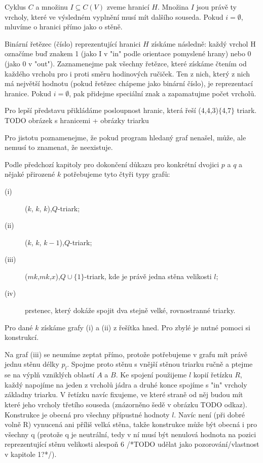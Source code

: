 \begin{definice}\label{def01:1}
Cyklus $C$ a množinu $I \subseteq C(V)$ zveme hranicí $H$. Množina $I$ jsou právě ty vrcholy, které ve výsledném vyplnění musí mít dalšího souseda. Pokud  $i = \emptyset$, mluvíme o hranici přímo jako o stěně.

Binární řetězec (číslo) reprezentující hranici $H$ získáme následně: každý vrchol H označíme buď znakem 1 (jako I v "in" podle orientace pomyslené hrany) nebo 0 (jako 0 v "out"). Zaznamenejme pak všechny řetězce, které získáme čtením od každého vrcholu pro i proti směru hodinových ručiček. Ten z nich, který z nich má největší hodnotu (pokud řetězec chápeme jako binární číslo), je reprezentací hranice. Pokud $i = \emptyset$, pak přidejme speciální znak a zapamatujme počet vrcholů.
\end{definice}

Pro lepší představu přikládáme posloupnost hranic, která řeší (4,4,3)$\lbrace$4,7$\rbrace$ triark. 
TODO obrázek s hranicemi + obrázky triarku

Pro jistotu poznamenejme, že pokud program hledaný graf nenašel, může, ale nemusí to znamenat, že neexistuje.

Podle předchozí kapitoly pro dokončení důkazu pro konkrétní dvojici $p$ a $q$ a nějaké přirozené $k$ potřebujeme tyto čtyři typy grafů:
\begin{description}
\item[(i)] ($k$, $k$, $k$),$Q$-triark;
\item[(ii)] ($k$, $k$, $k-1$),$Q$-triark;
\item[(iii)] ($mk$,$mk$,$x$),$Q\cup \lbrace 1\rbrace$-triark, kde je právě jedna stěna velikosti $l$;
\item[(iv)] prstenec, který dokáže spojit dva stejně velké, rovnostranné triarky.
\end{description}

Pro dané $k$ získáme grafy (i) a (ii) z řešítka hned. Pro zbylé je nutné pomoci si konstrukcí.

Na graf (iii) se neumíme zeptat přímo, protože potřebujeme v grafu mít právě jednu stěnu délky $p_l$. Spojme proto stěnu s vnější stěnou triarku ručně a ptejme se na výplň vzniklých oblastí $A$ a $B$. Ke spojení použijeme $l$ kopií řetízku $R$, každý napojíme na jeden z vrcholů jádra a druhé konce spojíme s "in" vrcholy základny triarku. V řetízku navíc fixujeme, ve které straně od něj budou mít které jeho vrcholy třetího souseda (znázorněno šedě v obrázku TODO odkaz). Konstrukce je obecná pro všechny přípustné hodnoty $l$. Navíc není (při dobré volně R) vynucená ani příliš velká stěna, takže konstrukce může být obecná i pro všechny q (protože q je neutrální, tedy v ní musí být nenulová hodnota na pozici reprezentující stěnu velikosti alespoň 6 /*TODO udělat jako pozorování/vlastnost v kapitole 1?*/).



